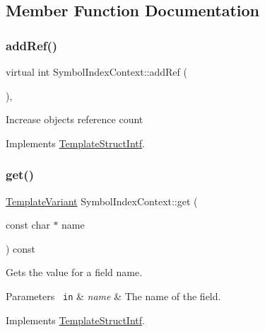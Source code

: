 \subsection{Member Function Documentation}
\mbox{\label{class_symbol_index_context_a383ab05fb032a231f451d74db071c28e}} 
\subsubsection{\texorpdfstring{addRef()}{addRef()}}
{\footnotesize\ttfamily virtual int Symbol\+Index\+Context\+::add\+Ref (\begin{DoxyParamCaption}{ }\end{DoxyParamCaption})\hspace{0.3cm}{\ttfamily [inline]}, {\ttfamily [virtual]}}

Increase object\textquotesingle{}s reference count 

Implements \mbox{\hyperlink{class_template_struct_intf_a05fe97ad47633beb326f69686faed581}{Template\+Struct\+Intf}}.

\mbox{\label{class_symbol_index_context_a14a6b834202fff93aabab305099f3a4a}} 
\subsubsection{\texorpdfstring{get()}{get()}}
{\footnotesize\ttfamily \mbox{\hyperlink{class_template_variant}{Template\+Variant}} Symbol\+Index\+Context\+::get (\begin{DoxyParamCaption}\item[{const char $\ast$}]{name }\end{DoxyParamCaption}) const\hspace{0.3cm}{\ttfamily [virtual]}}

Gets the value for a field name. 
\begin{DoxyParams}[1]{Parameters}
\mbox{\texttt{ in}}  & {\em name} & The name of the field. \\
\hline
\end{DoxyParams}


Implements \mbox{\hyperlink{class_template_struct_intf_a3d610cb81b4adbb531ebed3aa3d09b51}{Template\+Struct\+Intf}}.

